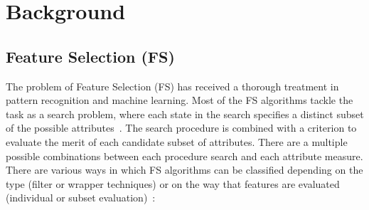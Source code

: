 \documentclass{elsart}
\begin{document}
%
%
%
%
%



\section{Background}
\label{sec:background}

\subsection{Feature Selection (FS)}
\label{subSec:featureSelection}
%
The problem of Feature Selection (FS) has received a thorough treatment in pattern recognition and machine learning. Most of the
FS algorithms tackle the task as a search problem, where each state in the search specifies a distinct subset of the possible
attributes~\cite{BL97}. The search procedure is combined with a criterion to evaluate the merit of each candidate subset of
attributes. There are a multiple possible combinations between each procedure search and each attribute measure\cite{LY05}. There are various ways in which FS algorithms can be classified depending on the type (filter or wrapper techniques) or on the way that features are evaluated (individual or subset evaluation)~\cite{BL97,Lan94,LM98,LY05,LY04}:%
\end{document}

